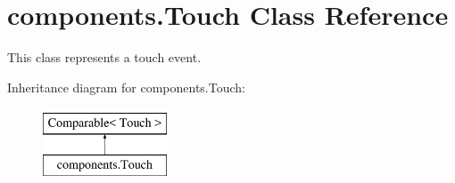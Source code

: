 \hypertarget{classcomponents_1_1_touch}{}\section{components.\+Touch Class Reference}
\label{classcomponents_1_1_touch}


This class represents a touch event.  


Inheritance diagram for components.\+Touch\+:\begin{figure}[H]
\begin{center}
\leavevmode
\includegraphics[height=2.000000cm]{classcomponents_1_1_touch}
\end{center}
\end{figure}
